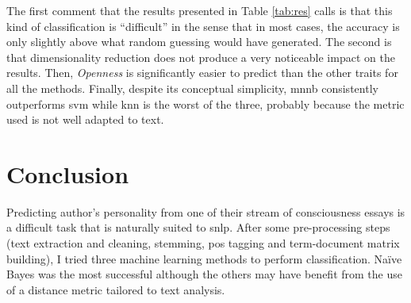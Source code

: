 The first comment that the results presented in Table \vref{tab:res} calls is that this kind of classification is \enquote{difficult} in the sense that in most cases, the accuracy is only slightly above what random guessing would have generated. The second is that dimensionality reduction does not produce a very noticeable impact on the results. Then, \emph{Openness} is significantly easier to predict than the other traits for all the methods. Finally, despite its conceptual simplicity, \gls{mnnb} consistently outperforms \gls{svm} while \gls{knn} is the worst of the three, probably because the metric used is not well adapted to text.

\section{Conclusion}
Predicting author's personality from one of their stream of consciousness essays is a difficult task that is naturally suited to \gls{snlp}. After some pre-processing steps (text extraction and cleaning, stemming, \gls{pos} tagging and term-document matrix building), I tried three machine learning methods to perform classification. Naïve Bayes was the most successful although the others may have benefit from the use of a distance metric tailored to text analysis.
